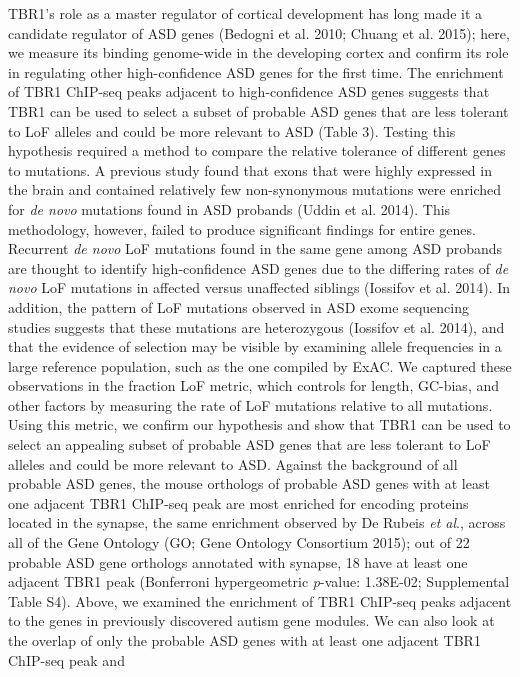 \documentclass[]{article}
\begin{document}
TBR1's role as a master regulator of cortical development has long made
it a candidate regulator of ASD genes (Bedogni et al. 2010; Chuang et
al. 2015); here, we measure its binding genome-wide in the developing
cortex and confirm its role in regulating other high-confidence ASD
genes for the first time. The enrichment of TBR1 ChIP-seq peaks adjacent
to high-confidence ASD genes suggests that TBR1 can be used to select a
subset of probable ASD genes that are less tolerant to LoF alleles and
could be more relevant to ASD (Table 3). Testing this hypothesis
required a method to compare the relative tolerance of different genes
to mutations. A previous study found that exons that were highly
expressed in the brain and contained relatively few non-synonymous
mutations were enriched for \emph{de novo} mutations found in ASD
probands (Uddin et al. 2014). This methodology, however, failed to
produce significant findings for entire genes. Recurrent \emph{de novo}
LoF mutations found in the same gene among ASD probands are thought to
identify high-confidence ASD genes due to the differing rates of
\emph{de novo} LoF mutations in affected versus unaffected siblings
(Iossifov et al. 2014). In addition, the pattern of LoF mutations
observed in ASD exome sequencing studies suggests that these mutations
are heterozygous (Iossifov et al. 2014), and that the evidence of
selection may be visible by examining allele frequencies in a large
reference population, such as the one compiled by ExAC. We captured
these observations in the fraction LoF metric, which controls for
length, GC-bias, and other factors by measuring the rate of LoF
mutations relative to all mutations. Using this metric, we confirm our
hypothesis and show that TBR1 can be used to select an appealing subset
of probable ASD genes that are less tolerant to LoF alleles and could be
more relevant to ASD. Against the background of all probable ASD genes,
the mouse orthologs of probable ASD genes with at least one adjacent
TBR1 ChIP-seq peak are most enriched for encoding proteins located in
the synapse, the same enrichment observed by De Rubeis \emph{et al}.,
across all of the Gene Ontology (GO; Gene Ontology Consortium 2015); out
of 22 probable ASD gene orthologs annotated with synapse, 18 have at
least one adjacent TBR1 peak (Bonferroni hypergeometric \emph{p}-value:
1.38E-02; Supplemental Table S4). Above, we examined the enrichment of
TBR1 ChIP-seq peaks adjacent to the genes in previously discovered
autism gene modules. We can also look at the overlap of only the
probable ASD genes with at least one adjacent TBR1 ChIP-seq peak and
\end{document}

